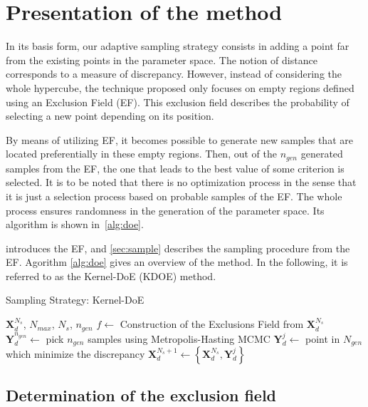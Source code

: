 \section{Presentation of the method}\label{sec:method}

In its basis form, our adaptive sampling strategy consists in adding a point far from the existing points in the parameter space. The notion of distance corresponds to a measure of discrepancy. However, instead of considering the whole hypercube, the technique proposed only focuses on empty regions defined using an Exclusion Field (EF). This exclusion field describes the probability of selecting a new point depending on its position.

By means of utilizing EF, it becomes possible to generate new samples that are located preferentially in these empty regions. Then, out of the $n_{gen}$ generated samples from the EF, the one that leads to the best value of some criterion is selected. It is to be noted that there is no optimization process in the sense that it is just a selection process based on probable samples of the EF. The whole process ensures randomness in the generation of the parameter space. Its algorithm is shown in~\cref{alg:doe}. %

 introduces the EF, and \cref{sec:sample} describes the sampling procedure from the EF. Agorithm \ref{alg:doe} gives an overview of the method. In the following, it is referred to as the Kernel-DoE (KDOE) method. 

\begin{algorithm}
  \caption{Sampling Strategy: Kernel-DoE}
  \label{alg:doe}
  \begin{algorithmic}[1]
  \Require $\mathbf{X}^{N_s}_d$, $N_{max}$, $N_s$, $n_{gen}$
    \State $f \gets$ Construction of the Exclusions Field from $\mathbf{X}^{N_s}_d$
    \State $\mathbf{Y}^{n_{gen}}_d \gets$ pick $n_{gen}$ samples using Metropolis-Hasting MCMC
    \State $\mathbf{Y}^{j}_d \gets$ point in $N_{gen}$ which minimize the discrepancy
	\State $\mathbf{X}^{N_s + 1}_d \gets \left\{\mathbf{X}^{N_s}_d, \mathbf{Y}^{j}_d \right\}$
  \EndWhile
  \end{algorithmic}
\end{algorithm}




\subsection{Determination of the exclusion field}\label{sec:kde}

